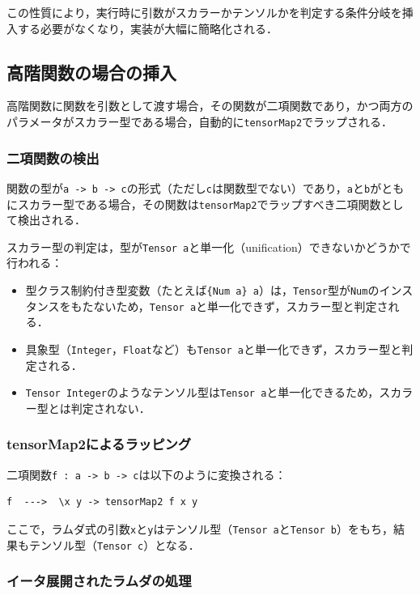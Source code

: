 この性質により，実行時に引数がスカラーかテンソルかを判定する条件分岐を挿入する必要がなくなり，実装が大幅に簡略化される．

\subsection{高階関数の場合の挿入}

高階関数に関数を引数として渡す場合，その関数が二項関数であり，かつ両方のパラメータがスカラー型である場合，自動的に\lstinline{tensorMap2}でラップされる．

\subsubsection{二項関数の検出}

関数の型が\lstinline{a -> b -> c}の形式（ただし\lstinline{c}は関数型でない）であり，\lstinline{a}と\lstinline{b}がともにスカラー型である場合，その関数は\lstinline{tensorMap2}でラップすべき二項関数として検出される．

スカラー型の判定は，型が\lstinline{Tensor a}と単一化（unification）できないかどうかで行われる：
\begin{itemize}
\item 型クラス制約付き型変数（たとえば\lstinline|{Num a} a|）は，\lstinline{Tensor}型が\lstinline{Num}のインスタンスをもたないため，\lstinline{Tensor a}と単一化できず，スカラー型と判定される．
\item 具象型（\lstinline{Integer}，\lstinline{Float}など）も\lstinline{Tensor a}と単一化できず，スカラー型と判定される．
\item \lstinline{Tensor Integer}のようなテンソル型は\lstinline{Tensor a}と単一化できるため，スカラー型とは判定されない．
\end{itemize}

\subsubsection{tensorMap2によるラッピング}

二項関数\lstinline{f : a -> b -> c}は以下のように変換される：
\begin{lstlisting}[language=egison,numbers=none]
f  --->  \x y -> tensorMap2 f x y
\end{lstlisting}
ここで，ラムダ式の引数\lstinline{x}と\lstinline{y}はテンソル型（\lstinline{Tensor a}と\lstinline{Tensor b}）をもち，結果もテンソル型（\lstinline{Tensor c}）となる．

\subsubsection{イータ展開されたラムダの処理}

